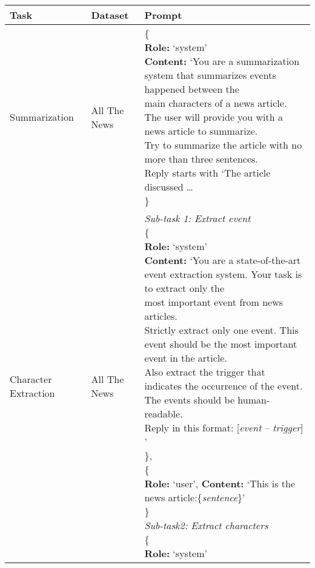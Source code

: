 \clearpage
\begin{center}
    \begin{tabular}{ | p{3.0cm} | p{3.0cm} | p{13cm} | }
        \hline
        \textbf{Task} & \textbf{Dataset} & \textbf{Prompt}\\
        \hline
        Summarization & All The News & \makecell[tl]{\{\\
        \quad\textbf{Role:} `system' \\
        \quad\textbf{Content:} `You are a summarization system that summarizes events happened between the\\
        \quad main characters of a news article. The user will provide you with a news article to summarize.\\
        \quad Try to summarize the article with no more than three sentences. \\
        \quad Reply starts with `The article discussed \dots \\
        \}
        } \\ 
        \hline
        Character Extraction & All The News & \makecell[tl]{\textit{Sub-task 1: Extract event }\\ 
        \{\\ 
        \quad \textbf{Role:} `system' \\
        \quad \textbf{Content:} `You are a state-of-the-art event extraction system. Your task is to extract only the \\
        \quad most important event from news articles. \\
        \quad Strictly extract only one event. This event should be the most important event in the article. \\
        \quad Also extract the trigger that indicates the occurrence of the event. \\
        \quad The events should be human-readable. \\
        \quad Reply in this format: [\textit{event} -- \textit{trigger}] '\\ 
        \}, \\
    \{\\ 
    \quad\textbf{Role:} `user', \textbf{Content:} `This is the news article:\{\textit{sentence}\}' \\ 
    \}\\
    \hline
    \textit{Sub-task2: Extract characters} \\ 
    \{\\
    \quad\textbf{Role:} `system' \\ 
}
\end{tabular}
\end{center}
